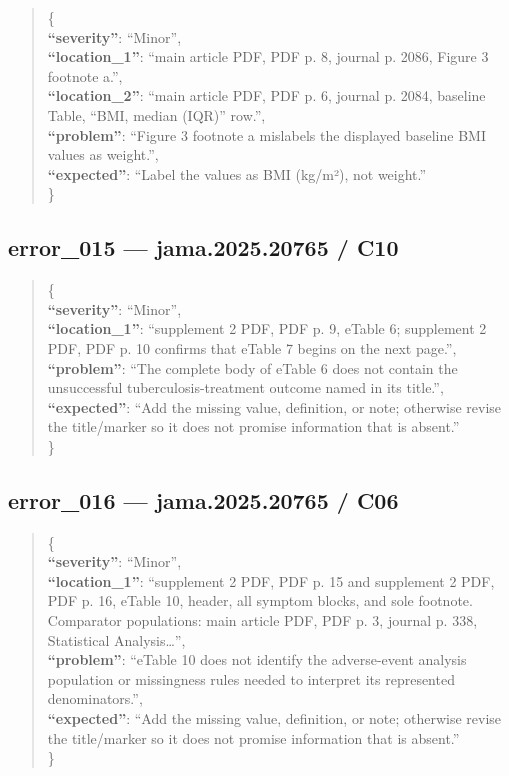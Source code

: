 \documentclass[
  letterpaper,
  9pt]{extreport}
\begin{document}
\begin{quote}
\{\\
\textbf{``severity''}: ``Minor'',\\
\textbf{``location\_1''}: ``main article PDF, PDF p. 8, journal p. 2086,
Figure 3 footnote a.'',\\
\textbf{``location\_2''}: ``main article PDF, PDF p. 6, journal p. 2084,
baseline Table, ``BMI, median (IQR)'' row.'',\\
\textbf{``problem''}: ``Figure 3 footnote a mislabels the displayed
baseline BMI values as weight.'',\\
\textbf{``expected''}: ``Label the values as BMI (kg/m²), not
weight.''\\
\}
\end{quote}

\hypertarget{error_015--jama202520765--c10}{%
\subsection{error\_015 --- jama.2025.20765 /
C10}\label{error_015--jama202520765--c10}}

\begin{quote}
\{\\
\textbf{``severity''}: ``Minor'',\\
\textbf{``location\_1''}: ``supplement 2 PDF, PDF p. 9, eTable 6;
supplement 2 PDF, PDF p. 10 confirms that eTable 7 begins on the next
page.'',\\
\textbf{``problem''}: ``The complete body of eTable 6 does not contain
the unsuccessful tuberculosis-treatment outcome named in its title.'',\\
\textbf{``expected''}: ``Add the missing value, definition, or note;
otherwise revise the title/marker so it does not promise information
that is absent.''\\
\}
\end{quote}

\hypertarget{error_016--jama202520765--c06}{%
\subsection{error\_016 --- jama.2025.20765 /
C06}\label{error_016--jama202520765--c06}}

\begin{quote}
\{\\
\textbf{``severity''}: ``Minor'',\\
\textbf{``location\_1''}: ``supplement 2 PDF, PDF p. 15 and supplement 2
PDF, PDF p. 16, eTable 10, header, all symptom blocks, and sole
footnote. Comparator populations: main article PDF, PDF p. 3, journal p.
338, Statistical Analysis\ldots{}'',\\
\textbf{``problem''}: ``eTable 10 does not identify the adverse-event
analysis population or missingness rules needed to interpret its
represented denominators.'',\\
\textbf{``expected''}: ``Add the missing value, definition, or note;
otherwise revise the title/marker so it does not promise information
that is absent.''\\
\}
\end{quote}
\end{document}
